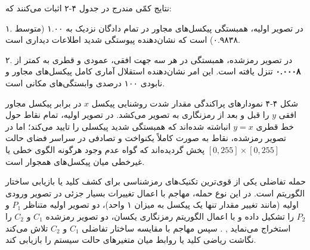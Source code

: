 

نتایج کمّی مندرج در جدول ۴{-}۲ اثبات می‌کنند که:\par

۱. در تصویر اولیه، همبستگی پیکسل‌های مجاور در تمام دادگان نزدیک به ۱.۰۰ (متوسط ۰.۹۸۳۸) است که نشان‌دهنده پیوستگی شدید اطلاعات دیداری است.\par

۲. در تصویر رمزشده، همبستگی در هر سه جهت افقی، عمودی و قطری به کمتر از \textbf{۰.۰۰۰۸} تنزل یافته است. این امر نشان‌دهنده استقلال آماری کامل پیکسل‌های مجاور و نابودی ۱۰۰ درصدی وابستگی‌های مکانی است.\par



شکل ۴{-}۴ نمودارهای پراکندگی  مقدار شدت روشنایی پیکسل $x$ در برابر پیکسل مجاور افقی $y$ را قبل و بعد از رمزنگاری به تصویر می‌کشد. در تصویر اولیه، تمام نقاط حول خط قطری $y = x$ انباشته شده‌اند که همبستگی شدید پیکسلی را تایید می‌کند؛ اما در تصویر رمزشده، نقاط به صورت کاملاً یکنواخت و تصادفی در سراسر فضای حالت $[0,\allowbreak{} 255] \times [0,\allowbreak{} 255]$ پخش گردیده‌اند که گواه عدم وجود هرگونه الگوی خطی یا غیرخطی میان پیکسل‌های همجوار است.\par






حمله تفاضلی  یکی از قوی‌ترین تکنیک‌های رمزشناسی برای کشف کلید یا بازیابی ساختار الگوریتم است. در این نوع حمله، مهاجم با اعمال تغییرات بسیار جزئی در تصویر ورودی اولیه (مانند تغییر مقدار تنها یک پیکسل به میزان ۱ واحد)، دو تصویر اولیه متناظر $P_1$ و $P_2$ را تشکیل داده و با اعمال الگوریتم رمزنگاری یکسان، دو تصویر رمزشده $C_1$ و $C_2$ را استخراج می‌نماید , . سپس مهاجم با مقایسه ساختار تفاضلی $C_1$ و $C_2$ تلاش می‌کند نگاشت ریاضی کلید یا روابط میان متغیرهای حالت سیستم را بازیابی کند.\par


